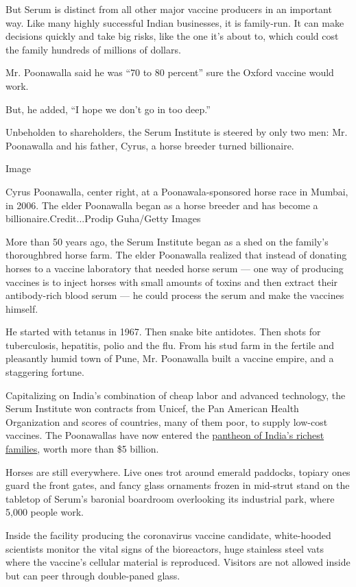 But Serum is distinct from all other major vaccine producers in an
important way. Like many highly successful Indian businesses, it is
family-run. It can make decisions quickly and take big risks, like the
one it's about to, which could cost the family hundreds of millions of
dollars.

Mr. Poonawalla said he was ``70 to 80 percent'' sure the Oxford vaccine
would work.

But, he added, ``I hope we don't go in too deep.''

Unbeholden to shareholders, the Serum Institute is steered by only two
men: Mr. Poonawalla and his father, Cyrus, a horse breeder turned
billionaire.

Image

Cyrus Poonawalla, center right, at a Poonawala-sponsored horse race in
Mumbai, in 2006. The elder Poonawalla began as a horse breeder and has
become a billionaire.Credit...Prodip Guha/Getty Images

More than 50 years ago, the Serum Institute began as a shed on the
family's thoroughbred horse farm. The elder Poonawalla realized that
instead of donating horses to a vaccine laboratory that needed horse
serum --- one way of producing vaccines is to inject horses with small
amounts of toxins and then extract their antibody-rich blood serum ---
he could process the serum and make the vaccines himself.

He started with tetanus in 1967. Then snake bite antidotes. Then shots
for tuberculosis, hepatitis, polio and the flu. From his stud farm in
the fertile and pleasantly humid town of Pune, Mr. Poonawalla built a
vaccine empire, and a staggering fortune.

Capitalizing on India's combination of cheap labor and advanced
technology, the Serum Institute won contracts from Unicef, the Pan
American Health Organization and scores of countries, many of them poor,
to supply low-cost vaccines. The Poonawallas have now entered the
\href{https://www.forbes.com/sites/naazneenkarmali/2020/04/07/indias-10-richest-billionaires-in-2020/\#316831d47c23}{pantheon
of India's richest families}, worth more than \$5 billion.

Horses are still everywhere. Live ones trot around emerald paddocks,
topiary ones guard the front gates, and fancy glass ornaments frozen in
mid-strut stand on the tabletop of Serum's baronial boardroom
overlooking its industrial park, where 5,000 people work.

Inside the facility producing the coronavirus vaccine candidate,
white-hooded scientists monitor the vital signs of the bioreactors, huge
stainless steel vats where the vaccine's cellular material is
reproduced. Visitors are not allowed inside but can peer through
double-paned glass.


